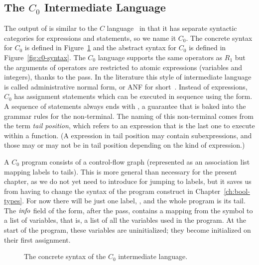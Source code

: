 \documentclass[11pt]{book}
\begin{document}
\subsection{The $C_0$ Intermediate Language}

The output of  is similar to the $C$
language~\citep{Kernighan:1988nx} in that it has separate syntactic
categories for expressions and statements, so we name it $C_0$.  The
concrete syntax for $C_0$ is defined in
Figure~\ref{fig:c0-concrete-syntax} and the abstract syntax for $C_0$
is defined in Figure~\ref{fig:c0-syntax}.
%
The $C_0$ language supports the same operators as $R_1$ but the
arguments of operators are restricted to atomic expressions (variables
and integers), thanks to the  pass.  In the
literature this style of intermediate language is called
administrative normal form, or ANF for
short~\citep{Danvy:1991fk,Flanagan:1993cg}.  Instead of 
expressions, $C_0$ has assignment statements which can be executed in
sequence using the  form. A sequence of statements always
ends with , a guarantee that is baked into the grammar
rules for the  non-terminal. The naming of this non-terminal
comes from the term \emph{tail position}, which refers to an
expression that is the last one to execute within a function. (A
expression in tail position may contain subexpressions, and those may
or may not be in tail position depending on the kind of expression.)

A $C_0$ program consists of a control-flow graph (represented as an
association list mapping labels to tails). This is more general than
necessary for the present chapter, as we do not yet need to introduce
 for jumping to labels, but it saves us from having to
change the syntax of the program construct in
Chapter~\ref{ch:bool-types}.  For now there will be just one label,
, and the whole program is its tail.
%
The $\mathit{info}$ field of the  form, after the
 pass, contains a mapping from the symbol
 to a list of variables, that is, a list of all the
variables used in the program. At the start of the program, these
variables are uninitialized; they become initialized on their first
assignment.

\begin{figure}[tbp]
\caption{The concrete syntax of the $C_0$ intermediate language.}
\label{fig:c0-concrete-syntax}
\end{figure}
\end{document}
